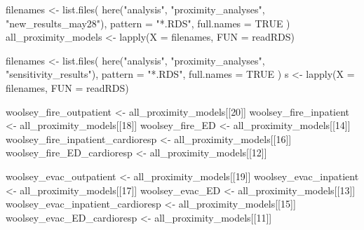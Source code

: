 \documentclass[
]{article}
\newenvironment{Shaded}{\begin{snugshade}}{\end{snugshade}}
\newcommand{\AttributeTok}[1]{\textcolor[rgb]{0.77,0.63,0.00}{#1}}
\newcommand{\ConstantTok}[1]{\textcolor[rgb]{0.00,0.00,0.00}{#1}}
\newcommand{\DecValTok}[1]{\textcolor[rgb]{0.00,0.00,0.81}{#1}}
\newcommand{\FunctionTok}[1]{\textcolor[rgb]{0.00,0.00,0.00}{#1}}
\newcommand{\NormalTok}[1]{#1}
\newcommand{\OtherTok}[1]{\textcolor[rgb]{0.56,0.35,0.01}{#1}}
\newcommand{\StringTok}[1]{\textcolor[rgb]{0.31,0.60,0.02}{#1}}
\begin{document}
\begin{Shaded}
\begin{Highlighting}[]
\NormalTok{filenames }\OtherTok{\textless{}{-}} \FunctionTok{list.files}\NormalTok{(}
  \FunctionTok{here}\NormalTok{(}\StringTok{"analysis"}\NormalTok{, }\StringTok{"proximity\_analyses"}\NormalTok{, }\StringTok{"new\_results\_may28"}\NormalTok{),}
  \AttributeTok{pattern =} \StringTok{"*.RDS"}\NormalTok{,}
  \AttributeTok{full.names =} \ConstantTok{TRUE}
\NormalTok{)}
\NormalTok{all\_proximity\_models }\OtherTok{\textless{}{-}} \FunctionTok{lapply}\NormalTok{(}\AttributeTok{X =}\NormalTok{ filenames, }\AttributeTok{FUN =}\NormalTok{ readRDS)}

\NormalTok{filenames }\OtherTok{\textless{}{-}} \FunctionTok{list.files}\NormalTok{(}
  \FunctionTok{here}\NormalTok{(}\StringTok{"analysis"}\NormalTok{, }\StringTok{"proximity\_analyses"}\NormalTok{, }\StringTok{"sensitivity\_results"}\NormalTok{),}
  \AttributeTok{pattern =} \StringTok{"*.RDS"}\NormalTok{,}
  \AttributeTok{full.names =} \ConstantTok{TRUE}
\NormalTok{)}
\NormalTok{s }\OtherTok{\textless{}{-}} \FunctionTok{lapply}\NormalTok{(}\AttributeTok{X =}\NormalTok{ filenames, }\AttributeTok{FUN =}\NormalTok{ readRDS)}


\NormalTok{woolsey\_fire\_outpatient }\OtherTok{\textless{}{-}}\NormalTok{ all\_proximity\_models[[}\DecValTok{20}\NormalTok{]]}
\NormalTok{woolsey\_fire\_inpatient }\OtherTok{\textless{}{-}}\NormalTok{ all\_proximity\_models[[}\DecValTok{18}\NormalTok{]]}
\NormalTok{woolsey\_fire\_ED }\OtherTok{\textless{}{-}}\NormalTok{ all\_proximity\_models[[}\DecValTok{14}\NormalTok{]]}
\NormalTok{woolsey\_fire\_inpatient\_cardioresp }\OtherTok{\textless{}{-}}\NormalTok{ all\_proximity\_models[[}\DecValTok{16}\NormalTok{]]}
\NormalTok{woolsey\_fire\_ED\_cardioresp }\OtherTok{\textless{}{-}}\NormalTok{ all\_proximity\_models[[}\DecValTok{12}\NormalTok{]]}

\NormalTok{woolsey\_evac\_outpatient }\OtherTok{\textless{}{-}}\NormalTok{ all\_proximity\_models[[}\DecValTok{19}\NormalTok{]]}
\NormalTok{woolsey\_evac\_inpatient }\OtherTok{\textless{}{-}}\NormalTok{ all\_proximity\_models[[}\DecValTok{17}\NormalTok{]]}
\NormalTok{woolsey\_evac\_ED }\OtherTok{\textless{}{-}}\NormalTok{ all\_proximity\_models[[}\DecValTok{13}\NormalTok{]]}
\NormalTok{woolsey\_evac\_inpatient\_cardioresp }\OtherTok{\textless{}{-}}\NormalTok{ all\_proximity\_models[[}\DecValTok{15}\NormalTok{]]}
\NormalTok{woolsey\_evac\_ED\_cardioresp }\OtherTok{\textless{}{-}}\NormalTok{ all\_proximity\_models[[}\DecValTok{11}\NormalTok{]]}


\end{Highlighting}
\end{Shaded}
\end{document}
